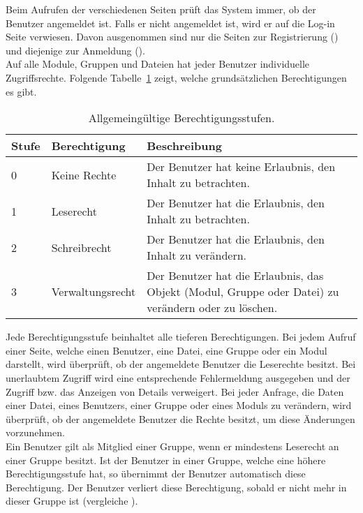 

Beim Aufrufen der verschiedenen Seiten prüft das System immer,
ob der Benutzer angemeldet ist. Falls er nicht angemeldet ist,
wird er auf die Log-in Seite verwiesen. Davon ausgenommen sind
nur die Seiten zur Registrierung () und diejenige zur Anmeldung (). \\

Auf alle Module, Gruppen und Dateien hat jeder Benutzer individuelle Zugriffsrechte. Folgende Tabelle~\ref{tab:rights} zeigt, welche grundsätzlichen Berechtigungen es gibt.

\begin{table}[H]
\begin{tabularx}{\textwidth}{|l|l|X|} \hline
\textbf{Stufe} & \textbf{Berechtigung}     & \textbf{Beschreibung} \\ \hline
0     & Keine Rechte     & Der Benutzer hat keine Erlaubnis, den Inhalt zu betrachten.\\ \hline
1     & Leserecht        & Der Benutzer hat die Erlaubnis, den Inhalt zu betrachten.\\ \hline
2     & Schreibrecht     & Der Benutzer hat die Erlaubnis, den Inhalt zu verändern.\\ \hline
3     & Verwaltungsrecht & Der Benutzer hat die Erlaubnis, das Objekt (Modul, Gruppe oder Datei) zu verändern oder zu löschen.\\ \hline
\end{tabularx}
\caption{Allgemeingültige Berechtigungsstufen.}
\label{tab:rights}
\end{table}

Jede Berechtigungsstufe beinhaltet alle tieferen Berechtigungen. Bei jedem Aufruf einer Seite, welche einen Benutzer, eine Datei, eine Gruppe oder ein Modul darstellt, wird überprüft, ob der angemeldete Benutzer die Leserechte besitzt. Bei unerlaubtem Zugriff wird eine entsprechende Fehlermeldung ausgegeben und der Zugriff bzw. das Anzeigen von Details verweigert. Bei jeder Anfrage, die Daten einer Datei, eines Benutzers, einer Gruppe oder eines Moduls zu verändern, wird überprüft, ob der angemeldete Benutzer die Rechte besitzt, um diese Änderungen vorzunehmen.\\

Ein Benutzer gilt als Mitglied einer Gruppe, wenn er mindestens Leserecht an einer Gruppe besitzt.
Ist der Benutzer in einer Gruppe, welche eine höhere Berechtigungsstufe hat, so übernimmt der Benutzer automatisch diese Berechtigung. Der Benutzer verliert diese Berechtigung, sobald er nicht mehr in dieser Gruppe ist (vergleiche ).\\


